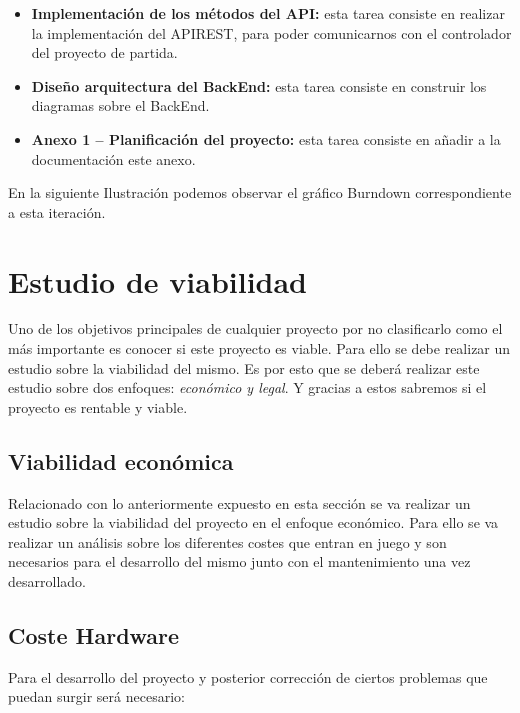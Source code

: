 \begin{itemize}

	\item \textbf{Implementación de los métodos del API:} esta tarea consiste en realizar la implementación del APIREST, para poder comunicarnos con el controlador del proyecto de partida.

	\item \textbf{Diseño arquitectura del BackEnd:} esta tarea consiste en construir los diagramas sobre el BackEnd.

	\item \textbf{Anexo 1 – Planificación del proyecto:} esta tarea consiste en añadir a la documentación este anexo.
\end{itemize}

En la siguiente Ilustración podemos observar el gráfico Burndown correspondiente a esta iteración.




\section{Estudio de viabilidad}

Uno de los objetivos principales de cualquier proyecto por no clasificarlo como el más importante es conocer si este proyecto es viable. Para ello se debe realizar un estudio sobre la viabilidad del mismo. Es por esto que se deberá realizar este estudio sobre dos enfoques: \emph{económico y legal}. Y gracias a estos sabremos si el proyecto es rentable y viable.

\subsection{Viabilidad económica}

Relacionado con lo anteriormente expuesto en esta sección se va realizar un estudio sobre la viabilidad del proyecto en el enfoque económico. Para ello se va realizar un análisis sobre los diferentes costes que entran en juego y son necesarios para el desarrollo del mismo junto con el mantenimiento una vez desarrollado.

\subsection{Coste Hardware}

Para el desarrollo del proyecto y posterior corrección de ciertos problemas que puedan surgir será necesario:

